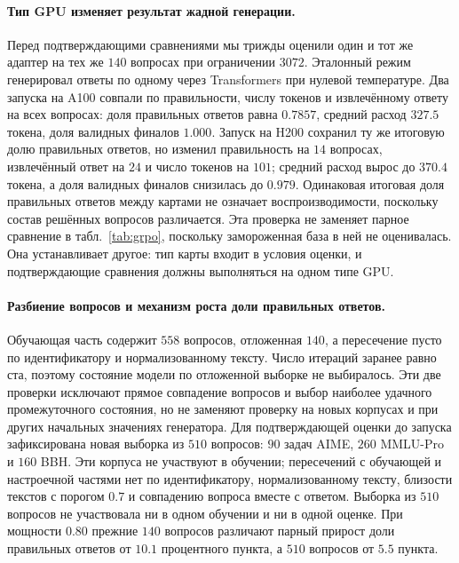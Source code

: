 \documentclass[11pt]{article}
\begin{document}
\paragraph{Тип GPU изменяет результат жадной генерации.} Перед подтверждающими сравнениями мы трижды оценили один и тот же адаптер на тех же $140$ вопросах при ограничении $3072$. Эталонный режим генерировал ответы по одному через Transformers при нулевой температуре. Два запуска на A100 совпали по правильности, числу токенов и извлечённому ответу на всех вопросах: доля правильных ответов равна $0.7857$, средний расход $327.5$ токена, доля валидных финалов $1.000$. Запуск на H200 сохранил ту же итоговую долю правильных ответов, но изменил правильность на $14$ вопросах, извлечённый ответ на $24$ и число токенов на $101$; средний расход вырос до $370.4$ токена, а доля валидных финалов снизилась до $0.979$. Одинаковая итоговая доля правильных ответов между картами не означает воспроизводимости, поскольку состав решённых вопросов различается. Эта проверка не заменяет парное сравнение в табл.~\ref{tab:grpo}, поскольку замороженная база в ней не оценивалась. Она устанавливает другое: тип карты входит в условия оценки, и подтверждающие сравнения должны выполняться на одном типе GPU.

\paragraph{Разбиение вопросов и механизм роста доли правильных ответов.} Обучающая часть содержит $558$ вопросов, отложенная $140$, а пересечение пусто по идентификатору и нормализованному тексту. Число итераций заранее равно ста, поэтому состояние модели по отложенной выборке не выбиралось. Эти две проверки исключают прямое совпадение вопросов и выбор наиболее удачного промежуточного состояния, но не заменяют проверку на новых корпусах и при других начальных значениях генератора. Для подтверждающей оценки до запуска зафиксирована новая выборка из $510$ вопросов: $90$ задач AIME, $260$ MMLU-Pro и $160$ BBH. Эти корпуса не участвуют в обучении; пересечений с обучающей и настроечной частями нет по идентификатору, нормализованному тексту, близости текстов с порогом $0.7$ и совпадению вопроса вместе с ответом. Выборка из $510$ вопросов не участвовала ни в одном обучении и ни в одной оценке. При мощности $0.80$ прежние $140$ вопросов различают парный прирост доли правильных ответов от $10.1$ процентного пункта, а $510$ вопросов от $5.5$ пункта.
\end{document}
